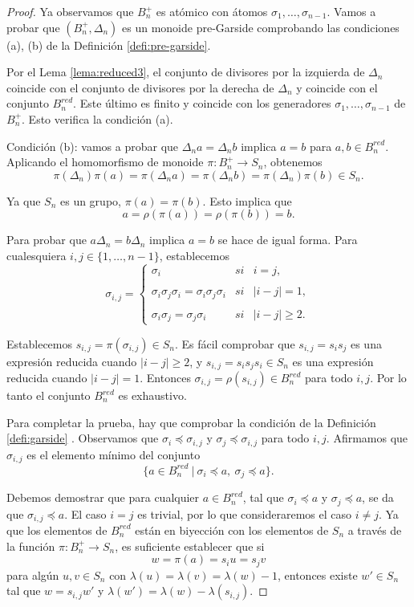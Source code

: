 \documentclass[12pt]{book}
\theoremstyle{definition}
\begin{document}
\begin{proof} Ya observamos que $B_n^+$ es atómico con átomos $\sigma_1,\ldots,\sigma_{n-1}$. Vamos a probar que $(B_n^+,\Delta_n)$ es un monoide pre-Garside comprobando las condiciones (a), (b) de la Definición \ref{defi:pre-garside}.

Por el Lema \ref{lema:reduced3}, el conjunto de divisores por la izquierda de $\Delta_n$ coincide con el conjunto de divisores por la derecha de $\Delta_n$ y coincide con el conjunto $B_n^{red}$. Este último es finito y coincide con los generadores $\sigma_1,\ldots,\sigma_{n-1}$ de $B_n^+$. Esto verifica la condición (a).

Condición (b): vamos a probar que $\Delta_n a=\Delta_n b$ implica $ a=b$ para $a,b\in B_n^{red}.$ Aplicando el homomorfismo de monoide $\pi: B_n^+\rightarrow S_n$, obtenemos
$$\pi(\Delta_n)\pi(a)=\pi(\Delta_n a)=\pi(\Delta_n b)=\pi(\Delta_n)\pi(b)\in S_n.$$

Ya que $S_n$ es un grupo, $\pi(a)=\pi(b)$. Esto implica que
$$a=\rho(\pi(a))=\rho(\pi(b))=b.$$

Para probar que $a\Delta_n=b\Delta_n$ implica $ a=b$ se hace de igual forma.
Para cualesquiera $i,j\in\{1,\ldots,n-1\}$, establecemos
$$\sigma_{i,j}= \left\{ \begin{array}{lcc}
             \sigma_i &   si  & i=j, \\
             \\ \sigma_i\sigma_j\sigma_i=\sigma_i\sigma_j\sigma_i &  si & |i-j|=1, \\
             \\ \sigma_i\sigma_j=\sigma_j\sigma_i &  si  & |i-j|\geq 2.
             \end{array}
   \right.$$
   
Establecemos $s_{i,j}=\pi(\sigma_{i,j})\in S_n$. Es fácil comprobar que $s_{i,j}=s_is_j$ es una expresión reducida cuando $|i-j|\geq 2$, y $s_{i,j}=s_is_js_i\in S_n$ es una expresión reducida cuando $|i-j|=1$. Entonces $\sigma_{i,j}=\rho(s_{i,j})\in B_n^{red}$ para todo $i,j$. Por lo tanto el conjunto $B_n^{red}$ es exhaustivo.

Para completar la prueba, hay que comprobar la condición de la Definición \ref{defi:garside}
. Observamos que $\sigma_i\preceq \sigma_{i,j}$ y $\sigma_j\preceq\sigma_{i,j}$ para todo $i,j$. Afirmamos que $\sigma_{i,j}$ es el elemento mínimo del conjunto
$$\{a\in B_n^{red}\ |\ \sigma_i\preceq a,\ \sigma_j\preceq a\}.$$

Debemos demostrar que para cualquier $a\in B_n^{red}$, tal que $\sigma_i\preceq a$ y $\sigma_j\preceq a$, se da que $\sigma_{i,j}\preceq a$. El caso $i=j$ es trivial, por lo que consideraremos el caso $i\neq j$. Ya que los elementos de $B_n^{red}$ están en biyección con los elementos de $S_n$ a través de la función $\pi: B_n^+\rightarrow S_n$, es suficiente establecer que si
$$w=\pi(a)=s_iu=s_jv$$
para algún $u,v\in S_n$ con $\lambda(u)=\lambda(v)=\lambda(w)-1$, entonces existe $w'\in S_n$ tal que $w=s_{i,j}w'$ y $\lambda(w')=\lambda(w)-\lambda(s_{i,j})$.


\end{proof}
\end{document}
